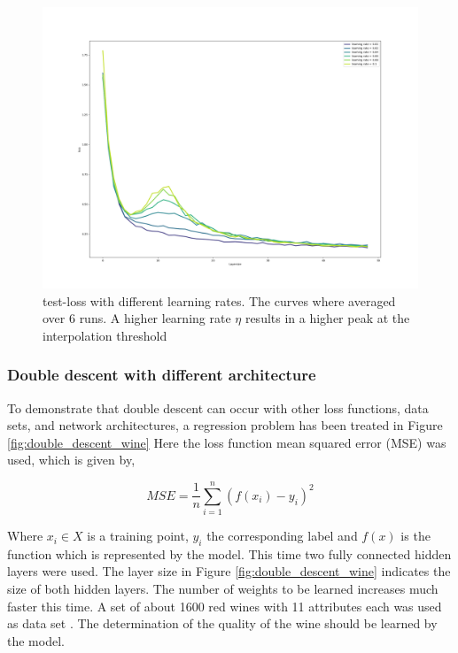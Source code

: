 \begin{figure}[!htp]
\centering
\includegraphics[width= 1\linewidth]{Abschlussarbeit_2021/LaTeX/images/different_learningrates.png}
\caption{test-loss with different learning rates. The curves where averaged over 6 runs. A higher learning rate $\eta$ results in a higher peak at the interpolation threshold}
\label{fig:learning_rates_double_descent}
\end{figure}

\subsubsection{Double descent with different architecture}
To demonstrate that double descent can occur with other loss functions, data sets, and network architectures, a regression problem has been treated in Figure \ref{fig:double_descent_wine} Here the loss function mean squared error (MSE) was used, which is given by,

\begin{equation}
    MSE = \frac{1}{n}\sum_{i=1}^{n}(f(x_i) - y_i)^2
    \label{mse_eq}
\end{equation}

Where $x_i \in X$ is a training point, $y_i$ the corresponding label and $f(x)$ is the function which is represented by the model. This time two fully connected hidden layers were used. The layer size in Figure \ref{fig:double_descent_wine} indicates the size of both hidden layers. The number of weights to be learned increases much faster this time. A set of about 1600 red wines with 11 attributes each was used as data set \cite{wine_data}. The determination of the quality of the wine should be learned by the model. 


